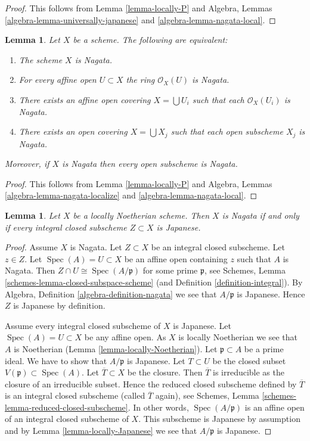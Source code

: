 \documentclass{stacks-project}
\theoremstyle{plain}
\newtheorem{lemma}[subsection]{Lemma}
\theoremstyle{definition}
\theoremstyle{remark}
\numberwithin{equation}{subsection}
\def\Spec{\mathop{\mathrm{Spec}}}
\begin{document}
\begin{proof}
This follows from Lemma \ref{lemma-locally-P} and
Algebra, Lemmas \ref{algebra-lemma-universally-japanese} and
\ref{algebra-lemma-nagata-local}.
\end{proof}

\begin{lemma}
\label{lemma-locally-nagata}
Let $X$ be a scheme. The following are equivalent:
\begin{enumerate}
\item The scheme $X$ is Nagata.
\item For every affine open $U \subset X$ the ring $\mathcal{O}_X(U)$
is Nagata.
\item There exists an affine open covering $X = \bigcup U_i$
such that each $\mathcal{O}_X(U_i)$ is Nagata.
\item There exists an open covering $X = \bigcup X_j$
such that each open subscheme $X_j$ is Nagata.
\end{enumerate}
Moreover, if $X$ is Nagata then every open subscheme is Nagata.
\end{lemma}

\begin{proof}
This follows from Lemma \ref{lemma-locally-P} and
Algebra, Lemmas \ref{algebra-lemma-nagata-localize} and
\ref{algebra-lemma-nagata-local}.
\end{proof}

\begin{lemma}
\label{lemma-characterize-nagata}
Let $X$ be a locally Noetherian scheme.
Then $X$ is Nagata if and only if every integral closed subscheme
$Z \subset X$ is Japanese.
\end{lemma}

\begin{proof}
Assume $X$ is Nagata. Let $Z \subset X$ be an integral closed subscheme.
Let $z \in Z$.
Let $\Spec(A) = U \subset X$ be an affine open containing $z$
such that $A$ is Nagata. Then
$Z \cap U \cong \Spec(A/\mathfrak p)$ for some prime $\mathfrak p$,
see Schemes, Lemma \ref{schemes-lemma-closed-subspace-scheme} (and
Definition \ref{definition-integral}). By
Algebra, Definition \ref{algebra-definition-nagata} we see
that $A/\mathfrak p$ is Japanese. Hence $Z$ is Japanese by definition.

\medskip\noindent
Assume every integral closed subscheme of $X$ is Japanese.
Let $\Spec(A) = U \subset X$ be any affine open.
As $X$ is locally Noetherian we see that $A$ is Noetherian
(Lemma \ref{lemma-locally-Noetherian}). Let $\mathfrak p \subset A$
be a prime ideal. We have to show that $A/\mathfrak p$ is Japanese.
Let $T \subset U$ be the closed subset $V(\mathfrak p) \subset \Spec(A)$.
Let $\overline{T} \subset X$ be the closure. Then $\overline{T}$ is
irreducible as the closure of an irreducible subset. Hence the reduced
closed subscheme defined by $\overline{T}$ is an integral closed
subscheme (called $\overline{T}$ again), see
Schemes, Lemma \ref{schemes-lemma-reduced-closed-subscheme}.
In other words, $\Spec(A/\mathfrak p)$ is an affine
open of an integral closed subscheme of $X$. This subscheme is Japanese
by assumption and by Lemma \ref{lemma-locally-Japanese} we see that
$A/\mathfrak p$ is Japanese.
\end{proof}
\end{document}
